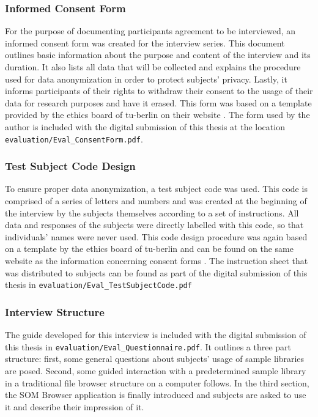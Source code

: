 \subsubsection{Informed Consent Form}
\label{subsubsec:consent_form}
For the purpose of documenting participants agreement to be interviewed, an
informed consent form was created for the interview series. This document
outlines basic information about the purpose and content of the interview and
its duration. It also lists all data that will be collected and explains the
procedure used for data anonymization in order to protect subjects' privacy.
Lastly, it informs participants of their rights to withdraw their consent to the
usage of their data for research purposes and have it erased. This form was
based on a template provided by the ethics board of \gls{tu-berlin} on
their website \citep{web:ethics2019}. The form used by the author is included
with the digital submission of this thesis at the location
\texttt{evaluation/Eval\_ConsentForm.pdf}.

\subsubsection{Test Subject Code Design}
\label{subsubsec:subject_code}
To ensure proper data anonymization, a test subject code was used. This code is
comprised of a series of letters and numbers and was created at the beginning of
the interview by the subjects themselves according to a set of instructions. All
data and responses of the subjects were directly labelled with this code, so
that individuals' names were never used. This code design procedure was again
based on a template by the ethics board of \gls{tu-berlin} and can be found on
the same website as the information concerning consent forms
\citep{web:ethics2019}. The instruction sheet that was distributed to subjects
can be found as part of the digital submission of this thesis in
\texttt{evaluation/Eval\_TestSubjectCode.pdf}

\subsubsection{Interview Structure}
\label{subsubsec:interview_structure}
The guide developed for this interview is included with the digital submission
of this thesis in \texttt{evaluation/Eval\_Questionnaire.pdf}. It outlines a
three part structure: first, some general questions about subjects' usage of
sample libraries are posed. Second, some guided interaction with a predetermined
sample library in a traditional file browser structure on a computer follows. In
the third section, the SOM Browser application is finally introduced and
subjects are asked to use it and describe their impression of it.

